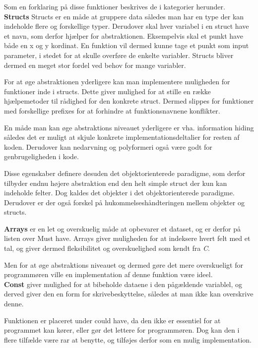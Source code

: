 \noindent Som en forklaring på disse funktioner beskrives de i kategorier herunder.\\

\noindent\textbf{Structs}
Structs er en måde at gruppere data således man har en type der kan indeholde flere og forskellige typer. Derudover skal hver variabel i en struct have et navn, som derfor hjælper for abstraktionen. Eksempelvis skal et punkt have både en x og y kordinat. En funktion vil dermed kunne tage et punkt som input parameter, i stedet for at skulle overføre de enkelte variabler. Structs bliver dermed en meget stor fordel ved behov for mange variabler.

For at øge abstraktionen yderligere kan man implementere muligheden for funktioner inde i structs. Dette giver mulighed for at stille en række hjælpemetoder til rådighed for den konkrete struct. Dermed slippes for funktioner med forskellige prefixes for at forhindre at funktionsnavnene konflikter.

En måde man kan øge abstraktions niveauet yderligere er vha. information hiding således det er muligt at skjule konkrete implementationsdeltalier for resten af koden. Derudover kan nedarvning og polyformeri også være godt for genbrugeligheden i kode.

Disse egenskaber definere desuden det objektorienterede paradigme, som derfor tilbyder endnu højere abstraktion end den helt simple struct der kun kan indeholde felter. Dog kaldes det objekter i det objektorienterede paradigme. Derudover er der også forskel på hukommelseshåndteringen mellem objekter og structs.

\noindent\textbf{Arrays}
er en let og overskuelig måde at opbevarer et dataset, og er derfor på listen over Must have. Arrays giver muligheden for at indeksere hvert felt med et tal, og giver dermed fleksibilitet og overskuelighed som kendt fra \textit{C}.

Men for at øge abstraktions niveauet og dermed gøre det mere overskueligt for programmøren ville en implementation af denne funktion være ideel.\\

\noindent\textbf{Const}
giver mulighed for at bibeholde dataene i den pågældende variablel, og derved giver den en form for skrivebeskyttelse, således at man ikke kan overskrive denne.

Funktionen er placeret under could have, da den ikke er essentiel for at programmet kan kører, eller gør det lettere for programmøren. 
Dog kan den i flere tilfælde være rar at benytte, og tilføjes derfor som en mulig implementation.\\

